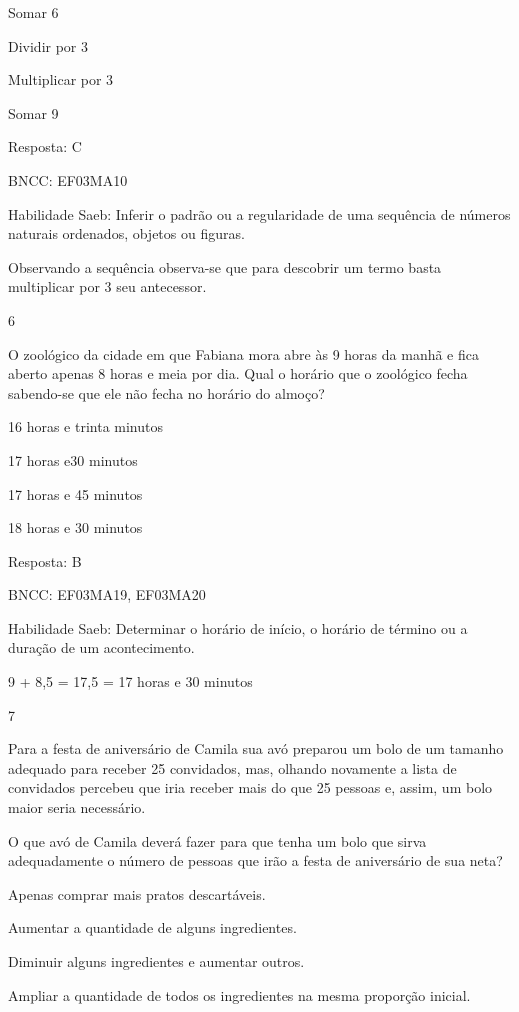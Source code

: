 \begin{escolha}
{\begin{escolha}
{\begin{escolha}
\item
  Somar 6
\item
  Dividir por 3
\item
  Multiplicar por 3
\item
  Somar 9
\end{escolha}

Resposta: C

BNCC: EF03MA10

Habilidade Saeb: Inferir o padrão ou a regularidade de uma sequência de
números naturais ordenados, objetos ou figuras.

Observando a sequência observa-se que para descobrir um termo basta
multiplicar por 3 seu antecessor.

\num{6}

O zoológico da cidade em que Fabiana mora abre às 9 horas da manhã e
fica aberto apenas 8 horas e meia por dia. Qual o horário que o
zoológico fecha sabendo-se que ele não fecha no horário do almoço?

\begin{escolha}
\item
  16 horas e trinta minutos
\item
  17 horas e30 minutos
\item
  17 horas e 45 minutos
\item
  18 horas e 30 minutos
\end{escolha}

Resposta: B

BNCC: EF03MA19, EF03MA20

Habilidade Saeb: Determinar o horário de início, o horário de término ou
a duração de um acontecimento.

9 + 8,5 = 17,5 = 17 horas e 30 minutos

\num{7}

Para a festa de aniversário de Camila sua avó preparou um bolo de um
tamanho adequado para receber 25 convidados, mas, olhando novamente a
lista de convidados percebeu que iria receber mais do que 25 pessoas e,
assim, um bolo maior seria necessário.

O que avó de Camila deverá fazer para que tenha um bolo que sirva
adequadamente o número de pessoas que irão a festa de aniversário de sua
neta?

\begin{escolha}
\item
  Apenas comprar mais pratos descartáveis.
\item
  Aumentar a quantidade de alguns ingredientes.
\item
  Diminuir alguns ingredientes e aumentar outros.
\item
  Ampliar a quantidade de todos os ingredientes na mesma proporção
  inicial.
\end{escolha}

}
\end{escolha}}
\end{escolha}
